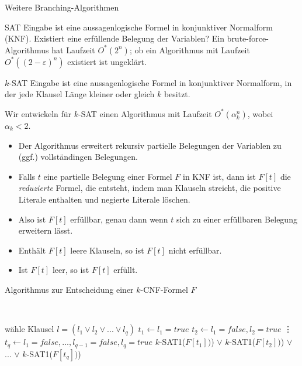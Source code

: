 \begin{section}{Weitere Branching-Algorithmen}
\begin{subsection}{SAT}
  Eingabe ist eine aussagenlogische Formel in konjunktiver Normalform (KNF). Existiert eine erfüllende Belegung der Variablen? Ein brute-force-Algorithmus hat Laufzeit \(O^*(2^n)\); ob ein Algorithmus mit Laufzeit \(O^*( (2-\varepsilon)^n )\) existiert ist ungeklärt.
\end{subsection}
  
\begin{subsection}{$k$-SAT}
  Eingabe ist eine aussagenlogische Formel in konjunktiver Normalform, in der jede Klausel Länge kleiner oder gleich \(k\) besitzt. 
  
  Wir entwickeln für $k$-SAT einen Algorithmus mit Laufzeit $O^*(\alpha_k^n)$, wobei $\alpha_k < 2$.
  \begin{itemize}
   \item Der Algorithmus erweitert rekursiv partielle Belegungen der Variablen zu (ggf.) vollständingen Belegungen. 
   \item Falls $t$ eine partielle Belegung einer Formel $F$ in KNF ist, dann ist $F[t]$ die \textit{reduzierte} Formel, die entsteht, indem man Klauseln streicht, die positive Literale enthalten und negierte Literale löschen. 
   \item Also ist $F[t]$ erfüllbar, genau dann wenn $t$ sich zu einer erfüllbaren Belegung erweitern lässt. 
   \item Enthält $F[t]$ leere Klauseln, so ist $F[t]$ nicht erfüllbar. 
   \item Ist $F[t]$ leer, so ist $F[t]$ erfüllt.
  \end{itemize}
  
  \begin{algorithm}[H]
    \caption{Algorithmus zur Entscheidung einer \(k\)-CNF-Formel \(F\)}

     \\


    wähle Klausel \(l = (l_1 \vee l_2 \vee ... \vee l_q)\)\;
    $t_1 \leftarrow l_1 = true$\; 
    $t_2 \leftarrow l_1 = false, l_2 = true$\;
    \vdots
    $t_q \leftarrow l_1 = false, \dots, l_{q-1} = false, l_q = true$\; 
    \Return \(k\)-SAT1(\(F[t_1])\)) \(\vee\) \(k\)-SAT1(\(F[t_2])\)) \(\vee\) ... \(\vee\) \(k\)-SAT1(\(F[t_q])\))\;
  \end{algorithm}


\end{subsection}
\end{section}
